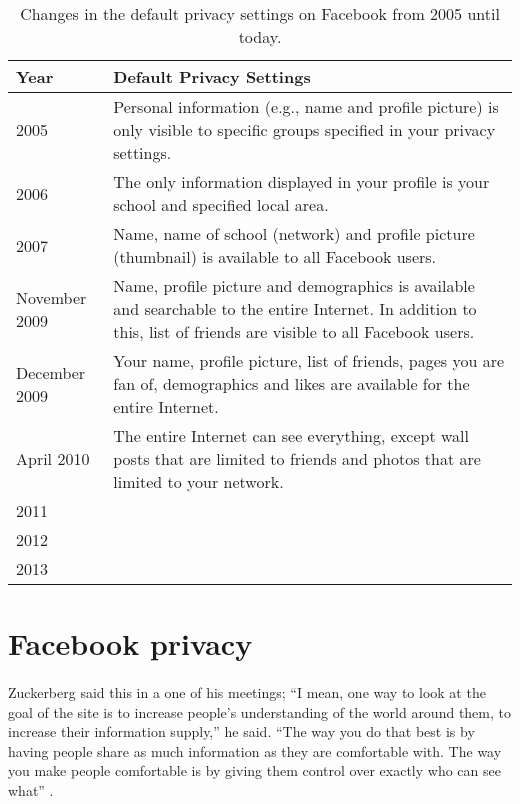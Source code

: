 \begin{center}
\begin{table}
\caption{\label{tab:dps}Changes in the default privacy settings on Facebook from 2005 until today. \cite{EvoPriv,PrivTimeline}}
    \begin{tabular}{ | l | p{9cm} |}
    \hline
    \textbf{Year} & \textbf{Default Privacy Settings} \\ 
    \hline
    2005 & Personal information (e.g., name and profile picture) is 	only visible to specific groups specified in your privacy 			settings.\\ 
    \hline
    2006 & The only information displayed in your profile is your 		school and specified local area. \\ 
    \hline
    2007 & Name, name of school (network) and profile picture 			(thumbnail) is available to all Facebook users.\\
    \hline
    November 2009 & Name, profile picture and demographics is 			available and searchable to the entire Internet. In addition to 	this, list of friends are visible to all Facebook users.\\
	\hline
    December 2009 & Your name, profile picture, list of friends, 		pages you are fan of, demographics and likes are available for 		the entire Internet.\\
    \hline
    April 2010 & The entire Internet can see everything, except 		wall posts that are limited to friends and photos that are 			limited to your network. \\
    \hline
    2011 &  \\
    \hline
    2012 & \\
    \hline
    2013 & \\
    \hline
    \end{tabular}
   \end{table}
\end{center}






\section{Facebook privacy}\label{sec:facebook_privacy}
\paragraph{}
Zuckerberg said this in a one of his meetings; “I mean, one way to look at the goal of the site is to increase people’s understanding of the world around them, to increase their information supply,” he said. “The way you do that best is by having people share as much information as they are comfortable with. The way you make people comfortable is by giving them control over exactly who can see what” \cite{MeMedia}.


